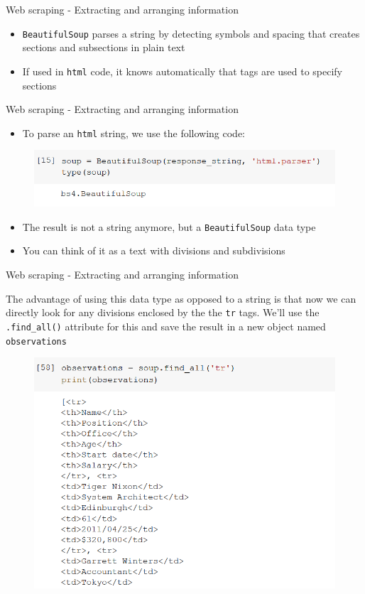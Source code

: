 \documentclass[aspectratio=169]{beamer}
\begin{document}
\begin{frame}{Web scraping - Extracting and arranging information}

	\begin{itemize}	
		\item \texttt{BeautifulSoup} parses a string by detecting symbols and spacing that creates sections and subsections in plain text
		\item If used in \texttt{html} code, it knows automatically that tags are used to specify sections
	\end{itemize}

\end{frame}

\begin{frame}{Web scraping - Extracting and arranging information}

	\begin{itemize}
		\item To parse an \texttt{html} string, we use the following code:
	\end{itemize}

	\begin{figure}
		\centering
		\includegraphics[width=0.7\linewidth]{img/bs4_type.png}
	\end{figure}

	\begin{itemize}	
		\item The result is not a string anymore, but a \texttt{BeautifulSoup} data type
		\item You can think of it as a text with divisions and subdivisions
	\end{itemize}

\end{frame}

\begin{frame}{Web scraping - Extracting and arranging information}

	The advantage of using this data type as opposed to a string is that now we can directly look for any divisions enclosed by the the \texttt{tr} tags. We'll use the \texttt{.find\_all()} attribute for this and save the result in a new object named \texttt{observations}

	\begin{figure}
		\centering
		\includegraphics[width=0.45\linewidth]{img/tr_list.png}
	\end{figure}

\end{frame}
\end{document}
